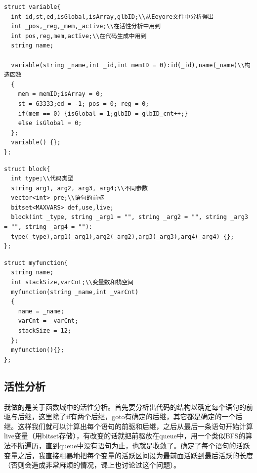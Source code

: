 \documentclass{ctexart}
\begin{document}
\begin{lstlisting}[basicstyle=\listingsfont,caption={变量结构},captionpos=b]
struct variable{
  int id,st,ed,isGlobal,isArray,glbID;\\从Eeyore文件中分析得出
  int _pos,_reg,_mem,_active;\\在活性分析中用到
  int pos,reg,mem,active;\\在代码生成中用到
  string name;

  variable(string _name,int _id,int memID = 0):id(_id),name(_name)\\构造函数
  {
    mem = memID;isArray = 0;
    st = 63333;ed = -1;_pos = 0;_reg = 0;
    if(mem == 0) {isGlobal = 1;glbID = glbID_cnt++;}
    else isGlobal = 0;
  };
  variable() {};
};
\end{lstlisting}
\begin{lstlisting}[basicstyle=\listingsfont,caption={代码块结构},captionpos=b]
struct block{
  int type;\\代码类型
  string arg1, arg2, arg3, arg4;\\不同参数
  vector<int> pre;\\语句的前驱
  bitset<MAXVARS> def,use,live;
  block(int _type, string _arg1 = "", string _arg2 = "", string _arg3 = "", string _arg4 = ""):
  type(_type),arg1(_arg1),arg2(_arg2),arg3(_arg3),arg4(_arg4) {};
};
\end{lstlisting}
\begin{lstlisting}[basicstyle=\listingsfont,caption={函数结构},captionpos=b]
struct myfunction{
  string name;
  int stackSize,varCnt;\\变量数和栈空间
  myfunction(string _name,int _varCnt)
  {
    name = _name;
    varCnt = _varCnt;
    stackSize = 12;
  };
  myfunction(){};
};
\end{lstlisting}

\subsection{活性分析}

我做的是关于函数域中的活性分析。首先要分析出代码的结构以确定每个语句的前驱与后继，这里除了if有两个后继，goto有确定的后继，其它都是确定的一个后继。这样我们就可以计算出每个语句的前驱和后继，之后从最后一条语句开始计算live变量（用bitset存储），有改变的话就把前驱放在queue中，用一个类似BFS的算法不断遍历，直到queue中没有语句为止，也就是收敛了。确定了每个语句的活跃变量之后，我直接粗暴地把每个变量的活跃区间设为最前面活跃到最后活跃的长度（否则会造成非常麻烦的情况，课上也讨论过这个问题）。
\end{document}
